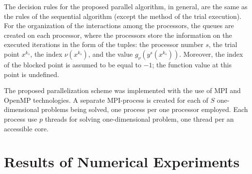 \documentclass[smallextended]{svjour3}       %
\begin{document}
The decision rules for the proposed parallel algorithm, in general, are the same as the rules of the sequential algorithm (except the method of the trial execution). For the organization of the interactions among the processors, the queues are created on each processor, where the processors store the information on the executed iterations in the form of the tuples: the processor number $s$, the trial point $x^{k_s}$, the index $\nu(x^{k_s})$, and the value $g_\nu(y^s (x^{k_s} ) )$. Moreover, the index of the blocked point is assumed to be equal to $-1$; the function value at this point is undefined.

The proposed parallelization scheme was implemented with the use of MPI and OpenMP technologies. A separate MPI-process is created for each of $S$ one-dimensional problems being solved, one process per one processor employed. Each process use $p$ threads for solving one-dimensional problem, one thread per an accessible core.



\section{Results of Numerical Experiments}
\label{sec:4}
\end{document}
